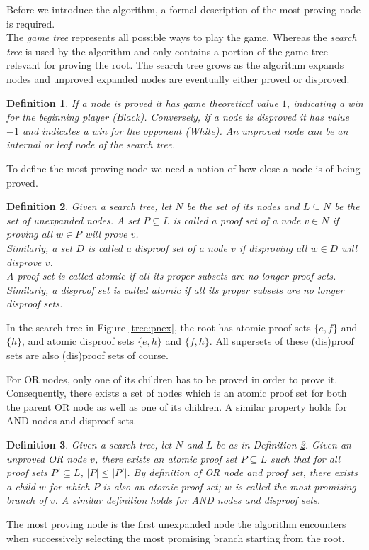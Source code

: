 \documentclass{article}
\newtheorem{mydef}{Definition}
\begin{document}
Before we introduce the algorithm, a formal description of the most proving node is required.\\
The \textit{game tree} represents all possible ways to play the game. Whereas the \textit{search tree} is used by the algorithm
and only contains a portion of the game tree relevant for proving the root. The search tree grows as the algorithm expands nodes and
unproved expanded nodes are eventually either proved or disproved.
\begin{mydef}
If a node is proved it has game theoretical value $1$, indicating a win for the beginning player (Black).
Conversely, if a node is disproved it has value $-1$ and indicates a win for the opponent (White).
An unproved node can be an internal or leaf node of the search tree.
\end{mydef}

To define the most proving node we need a notion of how close a node is of being proved.
\begin{mydef}
Given a search tree, let $N$ be the set of its nodes and $L \subseteq N$ be the set of unexpanded nodes. A set $P \subseteq L$ is called a proof set of a node $v \in N$ if proving all $w \in P$ will prove $v$.\\
Similarly, a set $D$ is called a disproof set of a node $v$ if disproving all $w \in D$ will disprove $v$.\\
A proof set is called atomic if all its proper subsets are no longer proof sets.\\
Similarly, a disproof set is called atomic if all its proper subsets are no longer disproof sets.
\label{def:pset}
\end{mydef}
In the search tree in Figure \ref{tree:pnex}, the root has atomic proof sets $\{e, f\}$ and $\{h\}$,
and atomic disproof sets $\{e, h\}$ and $\{f, h\}$. All supersets of these (dis)proof sets are also (dis)proof sets of course.

For OR nodes, only one of its children has to be proved in order to prove it. Consequently, there exists a set of nodes which is an atomic
proof set for both the parent OR node as well as one of its children. A similar property holds for AND nodes and disproof sets.
\begin{mydef}
Given a search tree, let $N$ and $L$ be as in Definition \ref{def:pset}.
Given an unproved OR node $v$, there exists an atomic proof set $P \subseteq L$ such that for all proof sets $P' \subseteq L$, $|P| \leq |P'|$.
By definition of OR node and proof set, there exists a child $w$ for which $P$ is also an atomic proof set; $w$ is called the most promising branch
of $v$. A similar definition holds for AND nodes and disproof sets.
\end{mydef}
The most proving node is the first unexpanded node the algorithm encounters when successively selecting the most promising branch starting from
the root.
\end{document}
